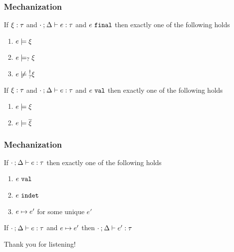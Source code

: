 \documentclass{beamer}
\begin{document}
\begin{frame}
\frametitle{Mechanization}
\begin{theorem}
	\label{theorem:exclusive-constraint-satisfaction}
	If $\xi : \tau$ and $\cdot \mathbin{;} \Delta \vdash e : \tau$ and $e ~\mathtt{final}$ then exactly one of the following holds
	\begin{enumerate}
		\item $e \models \xi$
		\item $e \models_{?} \xi$
		\item $\cnotsatisfyormay{e}{\xi}$
	\end{enumerate}
\end{theorem}

\begin{theorem}
	\label{theorem:exclusive-complete-constraint-satisfaction}
	If $\xi : \tau$ and $\cdot \mathbin{;} \Delta \vdash e : \tau$ and $e ~\mathtt{val}$ then exactly one of the following holds
	\begin{enumerate}
		\item $e \models \xi$
		\item $e \models \overline{\xi}$
	\end{enumerate}
\end{theorem}
\end{frame}

\begin{frame}
\frametitle{Mechanization}
\begin{theorem}
	\label{theorem:determinism}
	If $\cdot \mathbin{;} \Delta \vdash e : \tau$ then exactly one of the following holds
	\begin{enumerate}
		\item $e ~\mathtt{val}$
		\item $e ~\mathtt{indet}$
		\item $e \mapsto e'$ for some unique $e'$
	\end{enumerate}
\end{theorem}
\begin{theorem}[Preservation]
	\label{theorem:preservation}
	If $\cdot \mathbin{;} \Delta \vdash e : \tau$ and $e \mapsto e'$
	then $\cdot \mathbin{;} \Delta \vdash e' : \tau$
\end{theorem}
\end{frame}

\begin{frame}
\begin{center}
Thank you for listening!
\end{center}
\end{frame}
\end{document}
